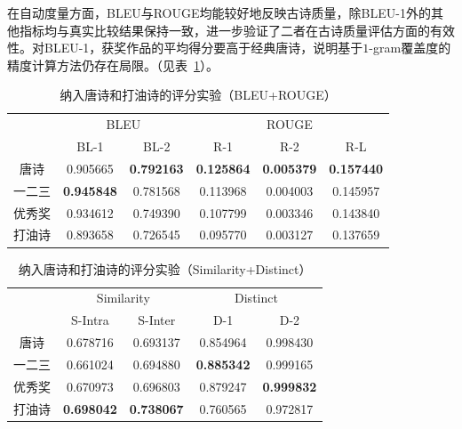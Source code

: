 在自动度量方面，BLEU与ROUGE均能较好地反映古诗质量，除BLEU-1外的其他指标均与真实比较结果保持一致，进一步验证了二者在古诗质量评估方面的有效性。对BLEU-1，获奖作品的平均得分要高于经典唐诗，说明基于$1$-gram覆盖度的精度计算方法仍存在局限。（见表~\ref{tab:test_scoring_all_dsr1_1}）。

\begin{table}[ht]
  \centering
  \caption{纳入唐诗和打油诗的评分实验（BLEU+ROUGE）}
  \label{tab:test_scoring_all_dsr1_1}
  \begin{tabular}{cccccc}
      \toprule
      &  \multicolumn{2}{c}{BLEU} & \multicolumn{3}{c}{ROUGE}\\
      \cmidrule(r){2-3} \cmidrule(l){4-6}
      & BL-1& BL-2& R-1& R-2& R-L\\
      \midrule
      唐诗	&	0.905665 	&	\bf{0.792163} 	&	\bf{0.125864} 	&	\bf{0.005379} 	&	\bf{0.157440} 	\\
      一二三	&	\bf{0.945848} 	&	0.781568 	&	0.113968 	&	0.004003 	&	0.145957 	\\
      优秀奖	&	0.934612 	&	0.749390 	&	0.107799 	&	0.003346 	&	0.143840 	\\
      打油诗	&	0.893658 	&	0.726545 	&	0.095770 	&	0.003127 	&	0.137659 	\\
      \bottomrule
  \end{tabular}
\end{table}

\begin{table}[ht]
  \centering
  \caption{纳入唐诗和打油诗的评分实验（Similarity+Distinct）}
  \label{tab:test_scoring_all_dsr1_2}
  \begin{tabular}{ccccc}
      \toprule
      & \multicolumn{2}{c}{Similarity} & \multicolumn{2}{c}{Distinct}\\
      \cmidrule(r){2-3} \cmidrule(l){4-5} 
      & S-Intra& S-Inter& D-1& D-2\\
      \midrule
      唐诗	&	0.678716 	&	0.693137 	&	0.854964 	&	0.998430 	\\
      一二三	&	0.661024 	&	0.694880 	&	\bf{0.885342} 	&	0.999165 	\\
      优秀奖	&	0.670973 	&	0.696803 	&	0.879247 	&	\bf{0.999832} 	\\
      打油诗	&	\bf{0.698042} 	&	\bf{0.738067} 	&	0.760565 	&	0.972817 	\\

      \bottomrule
  \end{tabular}
\end{table}

